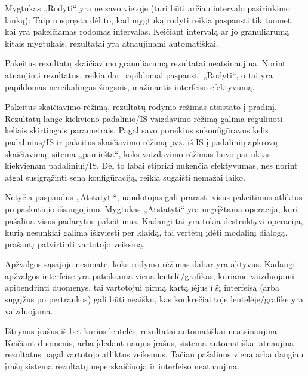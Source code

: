 {
  Mygtukas „Rodyti“ yra ne savo vietoje (turi būti arčiau intervalo
  pasirinkimo laukų):
}
{
  Taip nuspręsta dėl to, kad mygtuką rodyti reikia paspausti tik tuomet, kai yra
  pakeičiamas rodomas intervalas. Keičiant intervalą ar jo granuliarumą kitais mygtukais,
  rezultatai yra atnaujinami automatiškai.
}

{
  Pakeitus rezultatų skaičiavimo granuliarumą rezultatai neatsinaujina.
}
{
  Norint atnaujinti rezultatus, reikia dar papildomai paspausti „Rodyti“, o tai yra papildomas
  nereikalingas žingsnis, mažinantis interfeiso efektyvumą.
}

{
  Pakeitus skaičiavimo rėžimą, rezultatų rodymo rėžimas atsistato į pradinį.
}
{
  Rezultatų lange kiekvieno padalinio/IS vaizdavimo rėžimą galima reguliuoti keliais skirtingais
  parametrais. Pagal savo poreikius sukonfigūravus kelis padalinius/IS ir pakeitus skaičiavimo rėžimą pvz. iš IS į padalinių apkrovų skaičiavimą, sitema „pamiršta“, koks vaizdavimo rėžimas
  buvo parinktas kiekvienam padaliniui/IS. Dėl to labai stipriai nukenčia efektyvumas, nes norint
  atgal susigrąžinti seną konfigūraciją, reikia sugaišti nemažai laiko.
}

{
  Netyčia paspaudus „Atstatyti“, naudotojas gali prarasti visus pakeitimus
  atliktus po paskutinio išsaugojimo.
}
{
  Mygtukas „Atstatyti“ yra negrįžtama operacija, kuri pašalina visus padarytus pakeitimus.
  Kadangi tai yra tokia destruktyvi operacija, kurią nesunkiai galima iškviesti per klaidą,
  tai vertėtų įdėti modalinį dialogą, prašantį patvirtinti vartotojo veiksmą.
}

{
  Apžvalgos sąsajoje nesimatė, koks rodymo rėžimas dabar yra aktyvus.
}
{
  Kadangi apžvalgos interfeise yra pateikiama viena lentelė/grafikas, kuriame vaizduojami
  apibendrinti duomenys, tai vartotojui pirmą kartą įėjus į šį interfeisą (arba sugrįžus po
  pertraukos) gali būti neaišku, kas konkrečiai toje lentelėje/grafike yra vaizduojama.
}

{
  Ištrynus įrašus iš bet kurios lentelės, rezultatai automatiškai neatsinaujina.
}
{
  Keičiant duomenis, arba įdedant naujus įrašus, sistema automatiškai atnaujina rezultatus
  pagal vartotojo atliktus veiksmus. Tačiau pašalinus vieną arba daugiau įrašų sistema
  rezultatų neperskaičiuoja ir interfeiso neatnaujina.
}

